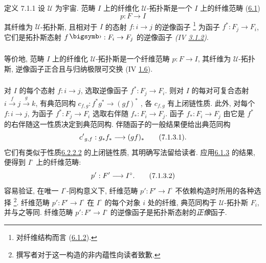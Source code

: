 \begin{enonce*}{定义 7.1.1}
设 $𝒰$ 为宇宙.
范畴 $I$ 上的纤维化 $𝒰$-拓扑斯是一个 $I$ 上的纤维范畴
(\hyperref[VI.def6.1]{6.1})
$$
p : F \to I
$$
其纤维为 $𝒰$-拓扑斯,
且相对于 $I$ 的态射 $f:i\to j$ 的逆像函子
\footnote{对纤维结构而言 (\hyperref[VI.subsubsec6.1.2]{6.1.2}).}
为函子 $f^{\ast}:F_j\to F_i$,
它们是拓扑斯态射 $f\bigdot:F_i\to F_j$ 的逆像函子
\emph{(IV \hyperref[IV.subsubsec3.1.2]{3.1.2})}.
\end{enonce*}

\setcounter{subsubsection}{1}
\subsubsection{}

等价地, 范畴 $I$ 上的纤维化 $𝒰$-拓扑斯是一个纤维范畴 $p:F\to I$,
其纤维为 $𝒰$-拓扑斯, 逆像函子\pageoriginale 正合且与归纳极限可交换
(IV \hyperref[IV.cor1.6]{1.6}).


\subsubsection{}

对 $I$ 的每个态射 $f:i\to j$, 选取逆像函子 $f^{\ast}:F_j\to F_i$.
则对 $I$ 的每对可复合态射 $i\xrightarrow{f}j\xrightarrow{g}k$,
有典范同构 $c_{f,g}:f^{\ast}g^{\ast}\to(gf)^{\ast}$
,
各 $c_{f,g}$ 有上闭链性质.
此外, 对每个 $f:i\to j$, 为函子 $f^{\ast}:F_j\to F_i$
选取右伴随 $f_{\ast}:F_i\to F_j$.
函子 $f_{\ast}:F_i\to F_j$ 由它是 $f^{\ast}$ 的右伴随这一性质决定到典范同构.
伴随函子的一般结果便给出典范同构
\begin{equation*}
{c'}_{g, f} : g_{\ast} f_{\ast} \to (gf)_{\ast}\tag{7.1.3.1}{\quoi}.
\end{equation*}
它们有类似于性质\hyperref[VI.eq6.1.2.2]{6.2.2.2} 的上闭链性质,
其明确写法留给读者.
应用\hyperref[VI.subsubsec6.1.3]{6.1.3} 的结果,
便得到 $I^{\circ}$ 上的纤维范畴:
\begin{equation*}
p': F'\to I^{\circ}{\quoi}.\tag{7.1.3.2}
\end{equation*}
容易验证, 在唯一 $I^{\circ}$-同构意义下,
纤维范畴 $p':F'\to I^{\circ}$ 不依赖构造时所用的各种选择
\footnote{撰写者对于这一构造的非内蕴性向读者致歉.}.
纤维范畴 $p':F'\to I^{\circ}$ 在 $I^{\circ}$ 的每个对象 $i$ 处的纤维,
典范同构于 $𝒰$-拓扑斯 $F_i$, 并与之等同.
纤维范畴 $p':F'\to I^{\circ}$ 的逆像函子是拓扑斯态射的\emph{正像}函子.

